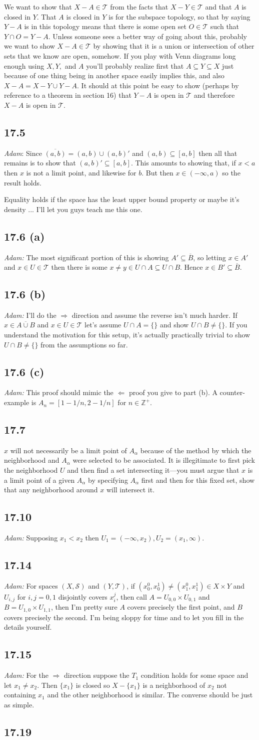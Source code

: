 \documentclass{article}
\renewcommand\ss{\subsection*}
\begin{document}
We want to show that $X-A\in \mathcal{T}$ from the facts that $X-Y\in \mathcal{T}$ and that $A$ is closed in $Y$.  That $A$ is closed in $Y$ is for the subspace topology, so that by saying $Y-A$ is in this topology means that there is some open set $O\in \mathcal{T}$ such that $Y\cap O=Y-A$.  Unless someone sees a better way of going about this, probably we want to show $X-A\in \mathcal{T}$ by showing that it is a union or intersection of other sets that we know are open, somehow.  If you play with Venn diagrams long enough using $X,Y,$ and $A$ you'll probably realize first that $A\subseteq Y\subseteq X$ just because of one thing being in another space easily implies this, and also $X-A=X-Y\cup Y-A$.  It should at this point be easy to show (perhaps by reference to a theorem in section 16) that $Y-A$ is open in $\mathcal{T}$ and therefore $X-A$ is open in $\mathcal{T}$.  
\ss{17.5} {\it Adam}: Since $\overline{(a,b)} = (a,b)\cup (a,b)'$ and $(a,b)\subseteq [a,b]$ then all that remains is to show that $(a,b)'\subseteq [a,b]$.  This amounts to showing that, if $x<a$ then $x$ is not a limit point, and likewise for $b$.  But then $x\in (-\infty,a)$ so the result holds.  

Equality holds if the space has the least upper bound property or maybe it's density ... I'll let you guys teach me this one.
\ss{17.6 (a)} {\it Adam:} The most significant portion of this is showing $A'\subseteq \overline{B}$, so letting $x\in A'$ and $x\in U\in \mathcal{T}$ then there is some $x\ne y\in U\cap A\subseteq U\cap B$.  Hence $x\in B'\subseteq \overline{B}$.
\ss{17.6 (b)} {\it Adam:} I'll do the $\Rightarrow$ direction and assume the reverse isn't much harder.  If $x\in \overline{A\cup B}$ and $x\in U\in \mathcal{T}$ let's assume $U\cap A=\{\}$ and show $U\cap B\ne \{\}$.  If you understand the motivation for this setup, it's actually practically trivial to show $U\cap B\ne \{\}$ from the assumptions so far.
\ss{17.6 (c)} {\it Adam:} This proof should mimic the $\Leftarrow$ proof you give to part (b).  A counter-example is $A_{n} = [1-1/n,2-1/n]$ for $n\in \mathbb{Z}^+$.
\ss{17.7}  $x$ will not necessarily be a limit point of $A_\alpha$ because of the method by which the neighborhood and $A_\alpha$ were selected to be associated.  It is illegitimate to first pick the neighborhood $U$ and then find a set intersecting it---you must argue that $x$ is a limit point of a given $A_\alpha$ by specifying $A_\alpha$ first and then for this fixed set, show that any neighborhood around $x$ will intersect it.
\ss{17.10} {\it Adam:} Supposing $x_1<x_2$ then $U_1 = (-\infty, x_2),U_2=(x_1,\infty)$.
\ss{17.14} {\it Adam:} For spaces $(X,\mathcal{S})$ and $(Y,\mathcal{T})$, if $(x_0^0,x_0^1)\ne (x_1^0,x_1^1)\in X\times Y$ and $U_{i,j}$ for $i,j=0,1$ disjointly covers $x_i^j$, then call $A=U_{0,0}\times U_{0,1}$ and $B=U_{1,0}\times U_{1,1}$, then I'm pretty sure $A$ covers precisely the first point, and $B$ covers precisely the second.  I'm being sloppy for time and to let you fill in the details yourself.
\ss{17.15} {\it Adam:} For the $\Rightarrow$ direction suppose the $T_1$ condition holds for some space and let $x_1\ne x_2$.  Then $\{x_1\}$ is closed so $X-\{x_1\}$ is a neighborhood of $x_2$ not containing $x_1$ and the other neighborhood is similar.  The converse should be just as simple.
\ss{17.19}
\end{document}
